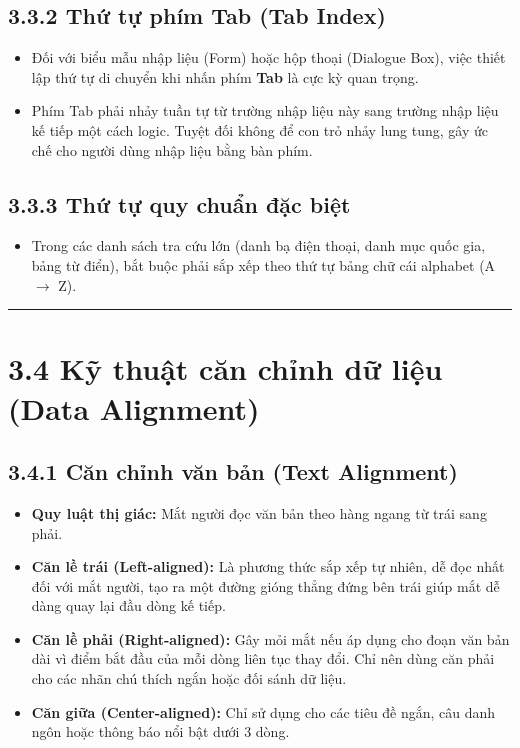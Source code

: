\documentclass[11pt,a4paper,oneside]{report}
\begin{document}
\subsection{3.3.2 Thứ tự phím Tab (Tab Index)}
\begin{itemize}[leftmargin=1.5em]
\item Đối với biểu mẫu nhập liệu (Form) hoặc hộp thoại (Dialogue Box), việc thiết lập thứ tự di chuyển khi nhấn phím \textbf{Tab} là cực kỳ quan trọng.
\item Phím Tab phải nhảy tuần tự từ trường nhập liệu này sang trường nhập liệu kế tiếp một cách logic. Tuyệt đối không để con trỏ nhảy lung tung, gây ức chế cho người dùng nhập liệu bằng bàn phím.
\end{itemize}

\subsection{3.3.3 Thứ tự quy chuẩn đặc biệt}
\begin{itemize}[leftmargin=1.5em]
\item Trong các danh sách tra cứu lớn (danh bạ điện thoại, danh mục quốc gia, bảng từ điển), bắt buộc phải sắp xếp theo thứ tự bảng chữ cái alphabet (A $\rightarrow$ Z).
\end{itemize}

\bigskip\hrule\bigskip

\section{3.4 Kỹ thuật căn chỉnh dữ liệu (Data Alignment)}

\subsection{3.4.1 Căn chỉnh văn bản (Text Alignment)}
\begin{itemize}[leftmargin=1.5em]
\item \textbf{Quy luật thị giác:} Mắt người đọc văn bản theo hàng ngang từ trái sang phải.
\item \textbf{Căn lề trái (Left-aligned):} Là phương thức sắp xếp tự nhiên, dễ đọc nhất đối với mắt người, tạo ra một đường gióng thẳng đứng bên trái giúp mắt dễ dàng quay lại đầu dòng kế tiếp.
\item \textbf{Căn lề phải (Right-aligned):} Gây mỏi mắt nếu áp dụng cho đoạn văn bản dài vì điểm bắt đầu của mỗi dòng liên tục thay đổi. Chỉ nên dùng căn phải cho các nhãn chú thích ngắn hoặc đối sánh dữ liệu.
\item \textbf{Căn giữa (Center-aligned):} Chỉ sử dụng cho các tiêu đề ngắn, câu danh ngôn hoặc thông báo nổi bật dưới 3 dòng.
\end{itemize}
\end{document}
